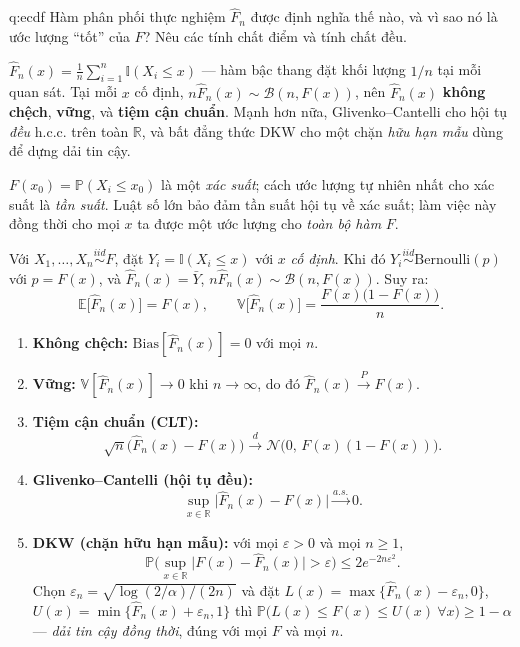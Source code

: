 
\begin{cauhoi}{q:ecdf}
Hàm phân phối thực nghiệm $\widehat F_n$ được định nghĩa thế nào, và vì sao nó là ước lượng ``tốt'' của $F$? Nêu các tính chất điểm và tính chất đều.
\end{cauhoi}

\begin{chot}
$\widehat F_n(x)=\frac1n\sum_{i=1}^n \mathbb{I}(X_i\le x)$ --- hàm bậc thang đặt khối lượng $1/n$ tại mỗi quan sát. Tại mỗi $x$ cố định, $n\widehat F_n(x)\sim \mathcal{B}(n,F(x))$, nên $\widehat F_n(x)$ \textbf{không chệch}, \textbf{vững}, và \textbf{tiệm cận chuẩn}. Mạnh hơn nữa, Glivenko--Cantelli cho hội tụ \emph{đều} h.c.c. trên toàn $\mathbb{R}$, và bất đẳng thức DKW cho một chặn \emph{hữu hạn mẫu} dùng để dựng dải tin cậy.
\end{chot}

$F(x_0)=\mathbb{P}(X_i\le x_0)$ là một \emph{xác suất}; cách ước lượng tự nhiên nhất cho xác suất là \emph{tần suất}. Luật số lớn bảo đảm tần suất hội tụ về xác suất; làm việc này đồng thời cho mọi $x$ ta được một ước lượng cho \emph{toàn bộ hàm} $F$.

Với $X_1,\dots,X_n\overset{iid}{\sim}F$, đặt $Y_i=\mathbb{I}(X_i\le x)$ với $x$ \emph{cố định}. Khi đó $Y_i\overset{iid}{\sim}\mathrm{Bernoulli}(p)$ với $p=F(x)$, và $\widehat F_n(x)=\bar Y$, $n\widehat F_n(x)\sim\mathcal{B}(n,F(x))$. Suy ra:
\[
\mathbb{E}\big[\widehat F_n(x)\big]=F(x),\qquad
\mathbb{V}\big[\widehat F_n(x)\big]=\frac{F(x)\big(1-F(x)\big)}{n}.
\]
\begin{enumerate}
\item \textbf{Không chệch:} $\mathrm{Bias}[\widehat F_n(x)]=0$ với mọi $n$.
\item \textbf{Vững:} $\mathbb{V}[\widehat F_n(x)]\to 0$ khi $n\to\infty$, do đó $\widehat F_n(x)\xrightarrow{P}F(x)$.
\item \textbf{Tiệm cận chuẩn (CLT):}
\[ \sqrt{n}\big(\widehat F_n(x)-F(x)\big)\xrightarrow{d}\mathcal{N}\big(0,\,F(x)(1-F(x))\big). \]
\item \textbf{Glivenko--Cantelli (hội tụ đều):}
\[ \sup_{x\in\mathbb{R}}\big|\widehat F_n(x)-F(x)\big|\xrightarrow{a.s.}0. \]
\item \textbf{DKW (chặn hữu hạn mẫu):} với mọi $\varepsilon>0$ và mọi $n\ge 1$,
\[ \mathbb{P}\Big(\sup_{x\in\mathbb{R}}\big|F(x)-\widehat F_n(x)\big|>\varepsilon\Big)\le 2e^{-2n\varepsilon^{2}}. \]
Chọn $\varepsilon_n=\sqrt{\log(2/\alpha)/(2n)}$ và đặt $L(x)=\max\{\widehat F_n(x)-\varepsilon_n,0\}$, $U(x)=\min\{\widehat F_n(x)+\varepsilon_n,1\}$ thì $\mathbb{P}\big(L(x)\le F(x)\le U(x)\ \forall x\big)\ge 1-\alpha$ --- \emph{dải tin cậy đồng thời}, đúng với mọi $F$ và mọi $n$.
\end{enumerate}

